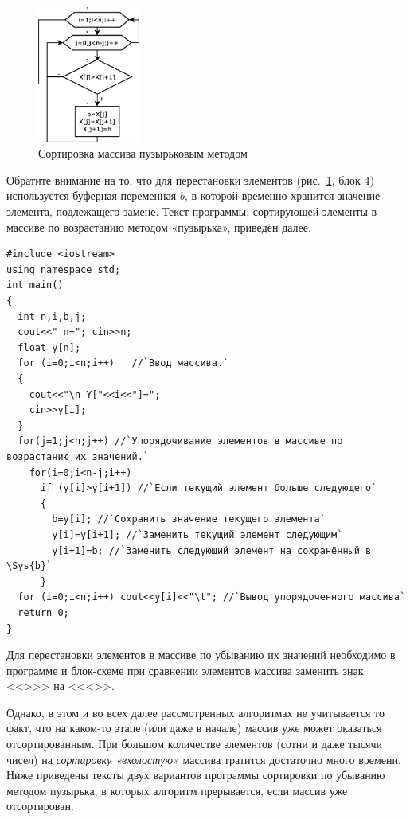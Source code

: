 \begin{figure}[htb]
\begin{center}
\includegraphics[width=0.3\textwidth]{img/ris_5_12}
\caption{Сортировка массива пузырьковым методом}
\label{ch05:refDrawing11}
\end{center}
\end{figure}

Обратите внимание на то, что для перестановки элементов (рис.~\ref{ch05:refDrawing11}, блок 4) используется буферная
переменная $b$, в которой временно хранится значение элемента, подлежащего замене. Текст программы, сортирующей элементы
в массиве по возрастанию методом «пузырька», приведён далее.
\begin{lstlisting}
#include <iostream>
using namespace std;
int main()
{
  int n,i,b,j;
  cout<<" n="; cin>>n;
  float y[n];
  for (i=0;i<n;i++)   //`Ввод массива.`
  {
    cout<<"\n Y["<<i<<"]=";
    cin>>y[i];
  }
  for(j=1;j<n;j++) //`Упорядочивание элементов в массиве по возрастанию их значений.`
    for(i=0;i<n-j;i++)
      if (y[i]>y[i+1]) //`Если текущий элемент больше следующего`
      {
        b=y[i]; //`Сохранить значение текущего элемента`
        y[i]=y[i+1]; //`Заменить текущий элемент следующим`
        y[i+1]=b; //`Заменить следующий элемент на сохранённый в \Sys{b}`
      }
  for (i=0;i<n;i++) cout<<y[i]<<"\t"; //`Вывод упорядоченного массива`
  return 0;
}
\end{lstlisting}

Для перестановки элементов в массиве по убыванию их значений необходимо в программе и блок-схеме при сравнении элементов
массива заменить знак <<{>}>> на <<{<}>>.

Однако, в этом и во всех далее рассмотренных алгоритмах не учитывается то факт, что на каком-то этапе (или даже в начале)
массив уже может оказаться отсортированным. При большом количестве элементов (сотни и даже тысячи чисел) на
\emph{сортировку «вхолостую»} массива тратится достаточно много времени. Ниже приведены тексты двух
вариантов программы сортировки по убыванию методом пузырька, в которых алгоритм прерывается, если массив уже
отсортирован.

